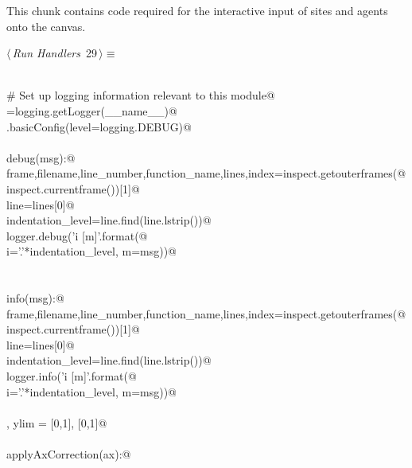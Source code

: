 \documentclass[10pt, english, oneside]{report}
\begin{document}
\begin{appendices}
This chunk contains code required for the interactive input of sites and agents onto the canvas. 

\begin{flushleft} \small\label{scrap25}\raggedright\small
{} $\langle\,${\itshape Run Handlers}\nobreak\ {\footnotesize {29}}$\,\rangle\equiv$
\vspace{-1ex}
\begin{list}{}{} \item
\mbox{}\verb@@\\
\mbox{}\verb@# Set up logging information relevant to this module@\\
\mbox{}\verb@logger=logging.getLogger(__name__)@\\
\mbox{}\verb@logging.basicConfig(level=logging.DEBUG)@\\
\mbox{}\verb@@\\
\mbox{}\verb@def debug(msg):@\\
\mbox{}\verb@    frame,filename,line_number,function_name,lines,index=inspect.getouterframes(@\\
\mbox{}\verb@        inspect.currentframe())[1]@\\
\mbox{}\verb@    line=lines[0]@\\
\mbox{}\verb@    indentation_level=line.find(line.lstrip())@\\
\mbox{}\verb@    logger.debug('{i} [{m}]'.format(@\\
\mbox{}\verb@        i='.'*indentation_level, m=msg))@\\
\mbox{}\verb@@\\
\mbox{}\verb@@\\
\mbox{}\verb@def info(msg):@\\
\mbox{}\verb@    frame,filename,line_number,function_name,lines,index=inspect.getouterframes(@\\
\mbox{}\verb@        inspect.currentframe())[1]@\\
\mbox{}\verb@    line=lines[0]@\\
\mbox{}\verb@    indentation_level=line.find(line.lstrip())@\\
\mbox{}\verb@    logger.info('{i} [{m}]'.format(@\\
\mbox{}\verb@        i='.'*indentation_level, m=msg))@\\
\mbox{}\verb@@\\
\mbox{}\verb@xlim, ylim = [0,1], [0,1]@\\
\mbox{}\verb@@\\
\mbox{}\verb@def applyAxCorrection(ax):@\\

\end{list}
\end{flushleft}
\end{appendices}
\end{document}

